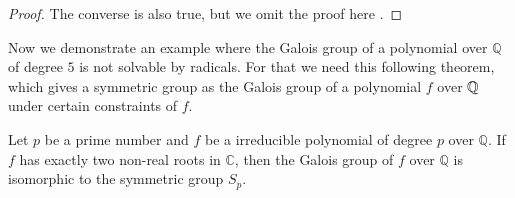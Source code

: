 \begin{proof}
%	
%	
The converse is also true, but we omit the proof here \cite[p.~76]{introduction-to-galois-theory}. 
\end{proof}


Now we demonstrate an example where the Galois group of a polynomial over $\mathbb Q$ of degree $5$ is not solvable by radicals. For that we need this following theorem, which gives a symmetric group as the Galois group of a polynomial $f$ over $\mathbb Q$ under certain constraints of $f$. 

\begin{theorem} \label{thm:galois-iso-symmetric}
	Let $p$ be a prime number and $f$ be a irreducible polynomial of degree $p$ over $\mathbb Q$. If $f$ has exactly two non-real roots in $\mathbb C$, then the Galois group of $f$ over $\mathbb Q$ is isomorphic to the symmetric group $S_p$.
\end{theorem}

